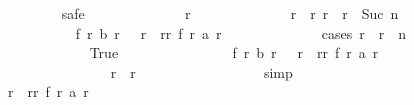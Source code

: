 \begin{isabellebody}
\ \ \ \ \ \ \ \ \ \ \isamarkupfalse%
\ safe\isanewline
\ \ \ \ \ \ \ \ \ \ \ \ \isamarkupfalse%
\ r\isanewline
\ \ \ \ \ \ \ \ \ \ \ \ \isamarkupfalse%
\ {\isachardoublequoteopen}r{}\ {\isasymle}\ r{\isachardoublequoteclose}\ {\isachardoublequoteopen}r\ {\isacharless}\ r{}\ {\isacharplus}\ Suc\ n{\isachardoublequoteclose}\isanewline
\ \ \ \ \ \ \ \ \ \ \ \ \isamarkupfalse%
\ {\isachardoublequoteopen}f\ r\ {\isacharparenleft}{\isacharquery}b\ r{\isacharparenright}\ {\isacharequal}\ {\isacharparenleft}{\isasymSum}\ r{\isacharprime}\ {\isasymleftarrow}\ {\isacharbrackleft}r{}{\isachardot}{\isachardot}{\isacharless}r{\isacharplus}{}{\isacharbrackright}{\isachardot}\ f\ r{\isacharprime}\ {\isacharparenleft}{\isacharquery}a\ r{\isacharprime}{\isacharparenright}{\isacharparenright}{\isachardoublequoteclose}\isanewline
\ \ \ \ \ \ \ \ \ \ \ \ \isamarkupfalse%
\ {\isacharparenleft}cases\ {\isachardoublequoteopen}r\ {\isacharless}\ r{}\ {\isacharplus}\ n{\isachardoublequoteclose}{\isacharparenright}\isanewline
\ \ \ \ \ \ \ \ \ \ \ \ \ \ \isamarkupfalse%
\ True\isanewline
\ \ \ \ \ \ \ \ \ \ \ \ \ \ \isamarkupfalse%
\ {\isachardoublequoteopen}f\ r\ {\isacharparenleft}{\isacharquery}b\ r{\isacharparenright}\ {\isacharequal}\ {\isacharparenleft}{\isasymSum}\ r{\isacharprime}\ {\isasymleftarrow}\ {\isacharbrackleft}r{}{\isachardot}{\isachardot}{\isacharless}r{\isacharplus}{}{\isacharbrackright}{\isachardot}\ f\ r{\isacharprime}\ {\isacharparenleft}a\ r{\isacharprime}{\isacharparenright}{\isacharparenright}{\isachardoublequoteclose}\isanewline
\ \ \ \ \ \ \ \ \ \ \ \ \ \ \ \ \isamarkupfalse%
\ {\isacharasterisk}{\isacharparenleft}{}{\isacharparenright}\ {\isacharbackquoteopen}r{}\ {\isasymle}\ r{\isacharbackquoteclose}\isanewline
\ \ \ \ \ \ \ \ \ \ \ \ \ \ \ \ \isamarkupfalse%
\ simp\isanewline
\ \ \ \ \ \ \ \ \ \ \ \ \ \ \isamarkupfalse%
\ \isamarkupfalse%
\ {\isachardoublequoteopen}{\isachardot}{\isachardot}{\isachardot}\ {\isacharequal}\ {\isacharparenleft}{\isasymSum}\ r{\isacharprime}\ {\isasymleftarrow}\ {\isacharbrackleft}r{}{\isachardot}{\isachardot}{\isacharless}r{\isacharplus}{}{\isacharbrackright}{\isachardot}\ f\ r{\isacharprime}\ {\isacharparenleft}{\isacharquery}a\ r{\isacharprime}{\isacharparenright}{\isacharparenright}{\isachardoublequoteclose}\isanewline

\end{isabellebody}
